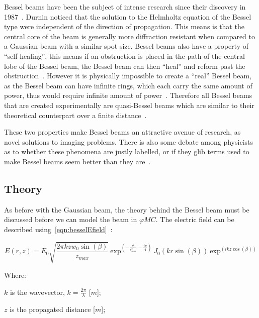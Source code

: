 Bessel beams have been the subject of intense research since their discovery in 1987~\cite{durnin1987diffraction,durnin1987exact}. 
Durnin noticed that the solution to the Helmholtz equation of the Bessel type were independent of the direction of propagation.
This means is that the central core of the beam is generally more diffraction resistant when compared to a Gaussian beam with a similar spot size.
Bessel beams also have a property of ``self-healing'', this means if an obstruction is placed in the path of the central lobe of the Bessel beam, the Bessel beam can then ``heal'' and reform past the obstruction~\cite{mcgloin2005bessel}.
However it is physically impossible to create a ``real'' Bessel beam, as the Bessel beam can have infinite rings, which each carry the same amount of power, thus would require infinite amount of power~\cite{durnin1987diffraction}.
Therefore all Bessel beams that are created experimentally are quasi-Bessel beams which are similar to their theoretical counterpart over a finite distance~\cite{durnin1987diffraction}.


These two properties make Bessel beams an attractive avenue of research, as novel solutions to imaging problems.
There is also some debate among physicists as to whether these phenomena are justly labelled, or if they glib terms used to make Bessel beams seem better than they are~\cite{debeer1987comment,harvey1984spot,durnin1987reply,sprangle1991comment,durnin1991durnin}.

\subsection{Theory}
As before with the Gaussian beam, the theory behind the Bessel beam must be discussed before we can model the beam in $\varphi MC$.
The electric field can be described using~\cref{eqn:besselEfield}~\cite{vcivzmar2006opticke}:

\begin{equation}
    E(r,z)=E_0\sqrt{\frac{2\pi k z w_0\sin(\beta)}{z_{max}}}\ \text{exp}^{\left(-\frac{z^2}{z_{max}^2}-\frac{i\pi}{4}\right)}\ J_0\left(kr\sin(\beta)\right)\ \text{exp}^{\left(ikz\cos(\beta)\right)}
    \label{eqn:besselEfield}
\end{equation}

\noindent Where:

    \indent $k$ is the wavevector, $k=\tfrac{2\pi}{\lambda}$ [$m$];

    \indent $z$ is the propagated distance [$m$]; 

